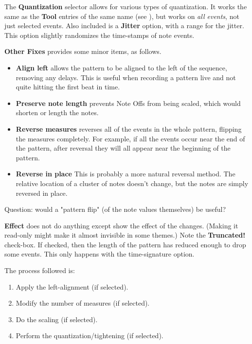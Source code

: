    The \textbf{Quantization} selector allows for various types of
   quantization.
   It works the same as the \textbf{Tool} entries of the
   same name (see ),
   but works on \textsl{all events}, not just selected events.
   Also included is a \textbf{Jitter} option, with a range for the jitter.
   This option slightly randomizes the time-stamps of note events.

   \textbf{Other Fixes} provides some minor items, as follows.

   \begin{itemize}
      \item \textbf{Align left}
         allows the pattern to be aligned to the left of the sequence, removing
         any delays.  This is useful when recording a pattern live and not quite
         hitting the first beat in time.
      \item \textbf{Preserve note length}
         prevents Note Offs from being scaled, which would shorten or length the
         notes.
      \item \textbf{Reverse measures}
         reverses all of the events in the whole pattern, flipping the measures
         completely.  For example, if all the events occur near the end of the
         pattern, after reversal they will all appear near the beginning of the
         pattern.
      \item \textbf{Reverse in place}
         This is probably a more natural reversal method.
         The relative location of a cluster of notes doesn't change, but the
         notes are simply reversed in place.
   \end{itemize}

   Question:  would a "pattern flip" (of the note values themselves) be useful?

   \textbf{Effect} does not do anything except show the effect of the changes.
   (Making it read-only might make it almost invisible in some themes.)
   Note the \textbf{Truncated!} check-box.  If checked, then
   the length of the pattern has reduced enough to drop some events.
   This only happens with the time-signature option.

   The process followed is:

   \begin{enumerate}
      \item Apply the left-alignment (if selected).
      \item Modify the number of measures (if selected).
      \item Do the scaling (if selected).
      \item Perform the quantization/tightening (if selected).
   \end{enumerate}

